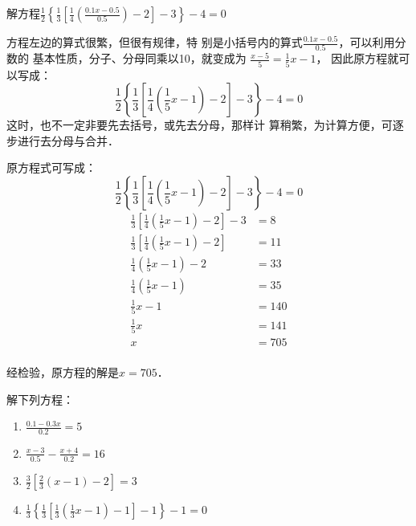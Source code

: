 \begin{example}
    解方程$\frac{1}{2}\left\{\frac{1}{3}\left[\frac{1}{4}\left(\frac{0.1x-0.5}{0.5}\right)-2\right]-3\right\}-4=0$
\end{example}

\begin{analyze}
方程左边的算式很繁，但很有规律，特
    别是小括号内的算式$\frac{0.1x-0.5}{0.5}$，可以利用分数的
    基本性质，分子、分母同乘以10，就变成为
$\frac{x-5}{5}=\frac{1}{5}x-1$，
    因此原方程就可以写成：
   \[\frac{1}{2}\left\{\frac{1}{3}\left[\frac{1}{4}\left(\frac{1}{5}x-1\right)-2\right]-3\right\}-4=0 \]
    这时，也不一定非要先去括号，或先去分母，那样计
    算稍繁，为计算方便，可逐步进行去分母与合并．
\end{analyze}

\begin{solution}
    原方程式可写成：\[\frac{1}{2}\left\{\frac{1}{3}\left[\frac{1}{4}\left(\frac{1}{5}x-1\right)-2\right]-3\right\}-4=0 \]
\begin{align*}
    \frac{1}{3}\left[\frac{1}{4}\left(\frac{1}{5}x-1\right)-2\right]-3 &=8  \tag{两边乘以2}\\
    \frac{1}{3}\left[\frac{1}{4}\left(\frac{1}{5}x-1\right)-2\right]&=11   \tag{移项、合并}\\
    \frac{1}{4}\left(\frac{1}{5}x-1\right)-2&=33  \tag{两边乘以3}\\
    \frac{1}{4}\left(\frac{1}{5}x-1\right)&=35   \tag{移项、合并}\\
    \frac{1}{5}x-1&=140 \tag{两边乘以4}\\
    \frac{1}{5}x&=141  \tag{移项、合并}\\
    x&=705  \tag{两边乘以5}\\
\end{align*}   

经检验，原方程的解是$x=705$．
\end{solution}

\begin{ex}
解下列方程：
\begin{enumerate}
    \item $\frac{0.1-0.3x}{0.2}=5$
    \item $\frac{x-3}{0.5}-\frac{x+4}{0.2}=16$
    \item $\frac{3}{2}\left[\frac{2}{3}(x-1)-2\right]=3$
    \item $\frac{1}{3}\left\{\frac{1}{3}\left[\frac{1}{3}\left(\frac{1}{3}x-1\right)-1\right]-1\right\}-1=0$
\end{enumerate}
\end{ex}

